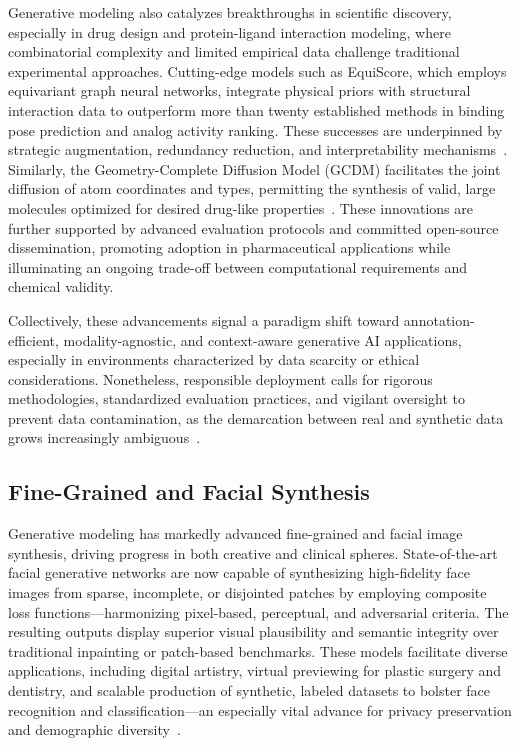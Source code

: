 Generative modeling also catalyzes breakthroughs in scientific discovery, especially in drug design and protein-ligand interaction modeling, where combinatorial complexity and limited empirical data challenge traditional experimental approaches. Cutting-edge models such as EquiScore, which employs equivariant graph neural networks, integrate physical priors with structural interaction data to outperform more than twenty established methods in binding pose prediction and analog activity ranking. These successes are underpinned by strategic augmentation, redundancy reduction, and interpretability mechanisms~\cite{ref59}. Similarly, the Geometry-Complete Diffusion Model (GCDM) facilitates the joint diffusion of atom coordinates and types, permitting the synthesis of valid, large molecules optimized for desired drug-like properties~\cite{ref74}. These innovations are further supported by advanced evaluation protocols and committed open-source dissemination, promoting adoption in pharmaceutical applications while illuminating an ongoing trade-off between computational requirements and chemical validity.

Collectively, these advancements signal a paradigm shift toward annotation-efficient, modality-agnostic, and context-aware generative AI applications, especially in environments characterized by data scarcity or ethical considerations. Nonetheless, responsible deployment calls for rigorous methodologies, standardized evaluation practices, and vigilant oversight to prevent data contamination, as the demarcation between real and synthetic data grows increasingly ambiguous~\cite{ref34,ref62,ref63,ref64,ref65,ref74,ref75,ref81,ref82,ref89,ref90}.

\subsection{Fine-Grained and Facial Synthesis}

Generative modeling has markedly advanced fine-grained and facial image synthesis, driving progress in both creative and clinical spheres. State-of-the-art facial generative networks are now capable of synthesizing high-fidelity face images from sparse, incomplete, or disjointed patches by employing composite loss functions—harmonizing pixel-based, perceptual, and adversarial criteria. The resulting outputs display superior visual plausibility and semantic integrity over traditional inpainting or patch-based benchmarks. These models facilitate diverse applications, including digital artistry, virtual previewing for plastic surgery and dentistry, and scalable production of synthetic, labeled datasets to bolster face recognition and classification—an especially vital advance for privacy preservation and demographic diversity~\cite{ref97}.

